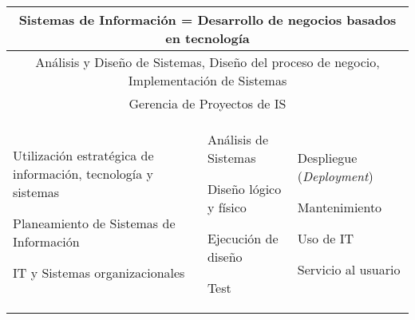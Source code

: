 \begin{center}
\begin{tabularx}{\textwidth}{|XXX|} \hline
\multicolumn{3}{|c|}{\textbf{Sistemas de Información = Desarrollo de negocios basados en tecnologí­a}} \\ \hline
\multicolumn{3}{|c|}{Análisis y Diseño de Sistemas, Diseño del proceso de negocio, Implementación de Sistemas} \\
\multicolumn{3}{|c|}{Gerencia de Proyectos de IS} \\ \hline
\begin{capenv}
\item Utilización estratégica de información, tecnologí­a y sistemas
\item Planeamiento de Sistemas de Información
\item \ac{IT} y Sistemas organizacionales
\end{capenv}
&
\begin{capenv}
\item Análisis de Sistemas
\item Diseño lógico y fí­sico
\item Ejecución de diseño
\item Test
\end{capenv}
&
\begin{capenv}
\item Despliegue (\textit{Deployment})
\item Mantenimiento
\item Uso de \ac{IT}
\item Servicio al usuario
\end{capenv} \\ \hline

\end{tabularx}
\end{center}